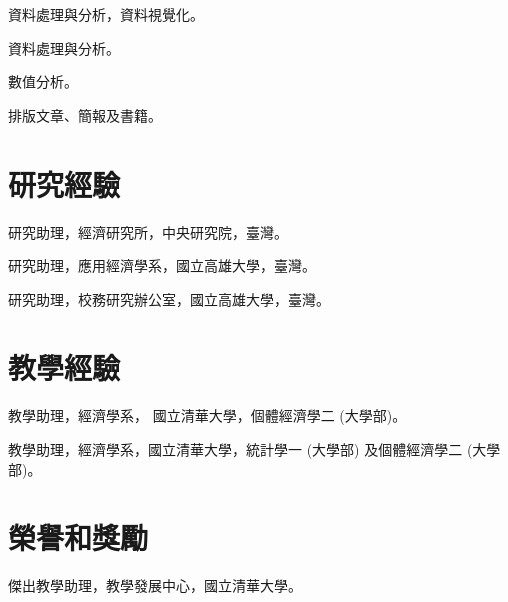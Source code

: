 \documentclass[utf8, 12pt]{article} %
\begin{document}
{資料處理與分析，資料視覺化。}

{資料處理與分析。}

{數值分析。}

{排版文章、簡報及書籍。}


\section{研究經驗}

{研究助理，經濟研究所，中央研究院，臺灣。}

{研究助理，應用經濟學系，國立高雄大學，臺灣。}

{研究助理，校務研究辦公室，國立高雄大學，臺灣。}


\section{教學經驗}

{
教學助理，經濟學系，%
國立清華大學，個體經濟學二 (大學部)。
}

{
教學助理，經濟學系，國立清華大學，統計學一 (大學部) 及個體經濟學二 (大學部)。
}


\section{榮譽和獎勵}

{
傑出教學助理，教學發展中心，國立清華大學。
}

\end{document}
